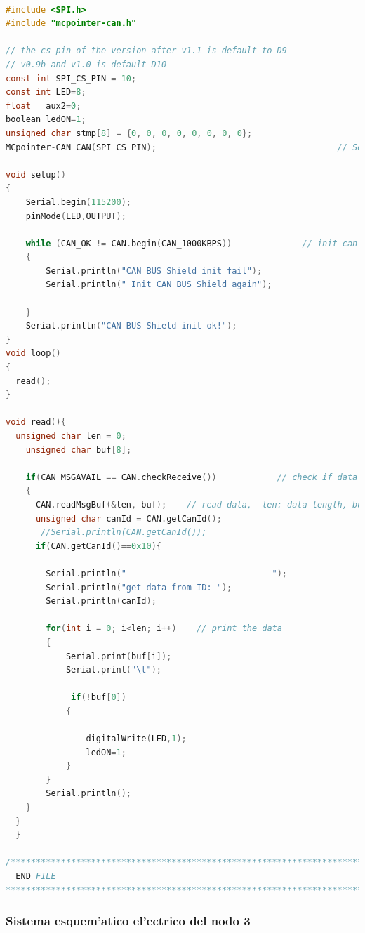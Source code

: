 {\tiny
\begin{lstlisting}[language=C]

#include <SPI.h>
#include "mcpointer-can.h"

// the cs pin of the version after v1.1 is default to D9
// v0.9b and v1.0 is default D10
const int SPI_CS_PIN = 10;
const int LED=8;
float   aux2=0;
boolean ledON=1;
unsigned char stmp[8] = {0, 0, 0, 0, 0, 0, 0, 0};
MCpointer-CAN CAN(SPI_CS_PIN);                                    // Set CS pin

void setup()
{
    Serial.begin(115200);
    pinMode(LED,OUTPUT);

    while (CAN_OK != CAN.begin(CAN_1000KBPS))              // init can bus : baudrate = 500k
    {
        Serial.println("CAN BUS Shield init fail");
        Serial.println(" Init CAN BUS Shield again");
        
    }
    Serial.println("CAN BUS Shield init ok!");
}
void loop()
{
  read();   
}

void read(){
  unsigned char len = 0;
    unsigned char buf[8];

    if(CAN_MSGAVAIL == CAN.checkReceive())            // check if data coming
    {
      CAN.readMsgBuf(&len, buf);    // read data,  len: data length, buf: data buf
      unsigned char canId = CAN.getCanId();
       //Serial.println(CAN.getCanId());
      if(CAN.getCanId()==0x10){

        Serial.println("-----------------------------");
        Serial.println("get data from ID: ");
        Serial.println(canId);

        for(int i = 0; i<len; i++)    // print the data
        {
            Serial.print(buf[i]);
            Serial.print("\t");
            
             if(!buf[0])
            {

                digitalWrite(LED,1);
                ledON=1;
            }
        }
        Serial.println();     
    }           
  }
  }

/*********************************************************************************************************
  END FILE
*********************************************************************************************************/
 \end{lstlisting}
}


\subsubsection{Sistema esquem'atico el'ectrico del nodo 3}

